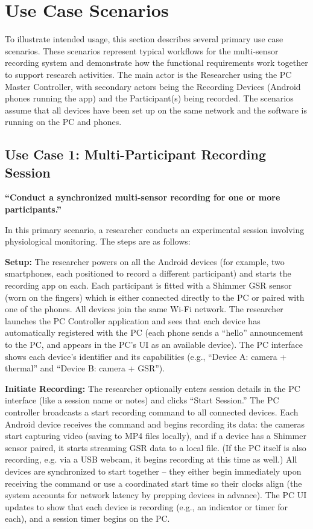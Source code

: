 \section{Use Case Scenarios}

To illustrate intended usage, this section describes several primary use case scenarios. These scenarios represent typical workflows for the multi-sensor recording system and demonstrate how the functional requirements work together to support research activities. The main actor is the Researcher using the PC Master Controller, with secondary actors being the Recording Devices (Android phones running the app) and the Participant(s) being recorded. The scenarios assume that all devices have been set up on the same network and the software is running on the PC and phones.

\subsection{Use Case 1: Multi-Participant Recording Session}

\textbf{``Conduct a synchronized multi-sensor recording for one or more participants.''}

In this primary scenario, a researcher conducts an experimental session involving physiological monitoring. The steps are as follows:

\textbf{Setup:} The researcher powers on all the Android devices (for example, two smartphones, each positioned to record a different participant) and starts the recording app on each. Each participant is fitted with a Shimmer GSR sensor (worn on the fingers) which is either connected directly to the PC or paired with one of the phones. All devices join the same Wi-Fi network. The researcher launches the PC Controller application and sees that each device has automatically registered with the PC (each phone sends a ``hello'' announcement to the PC, and appears in the PC's UI as an available device). The PC interface shows each device's identifier and its capabilities (e.g., ``Device A: camera + thermal'' and ``Device B: camera + GSR'').

\textbf{Initiate Recording:} The researcher optionally enters session details in the PC interface (like a session name or notes) and clicks ``Start Session.'' The PC controller broadcasts a start recording command to all connected devices. Each Android device receives the command and begins recording its data: the cameras start capturing video (saving to MP4 files locally), and if a device has a Shimmer sensor paired, it starts streaming GSR data to a local file. (If the PC itself is also recording, e.g. via a USB webcam, it begins recording at this time as well.) All devices are synchronized to start together -- they either begin immediately upon receiving the command or use a coordinated start time so their clocks align (the system accounts for network latency by prepping devices in advance). The PC UI updates to show that each device is recording (e.g., an indicator or timer for each), and a session timer begins on the PC.

